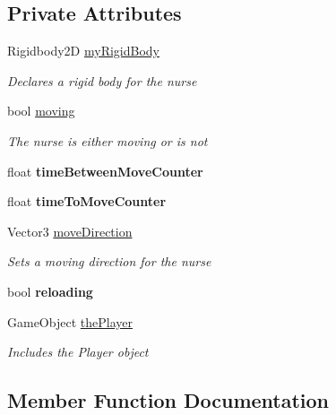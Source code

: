 \subsection*{Private Attributes}
\begin{DoxyCompactItemize}
\item 
Rigidbody2D \mbox{\hyperlink{class_nurse_controller_aa101cdff336129084914ac7b99c48dde}{my\+Rigid\+Body}}
\begin{DoxyCompactList}\small\item\em Declares a rigid body for the nurse \end{DoxyCompactList}\item 
bool \mbox{\hyperlink{class_nurse_controller_a51594c8ff5d4c71eeec6aef9fff4819c}{moving}}
\begin{DoxyCompactList}\small\item\em The nurse is either moving or is not \end{DoxyCompactList}\item 
\mbox{\label{class_nurse_controller_a9bfdcd467ebbc3af37fe73001a4849c9}} 
float {\bfseries time\+Between\+Move\+Counter}
\item 
\mbox{\label{class_nurse_controller_a2c76f2ef1ad2679c9696608306ad533f}} 
float {\bfseries time\+To\+Move\+Counter}
\item 
Vector3 \mbox{\hyperlink{class_nurse_controller_af1bbb9415d5e5fc25461cff6f72722f3}{move\+Direction}}
\begin{DoxyCompactList}\small\item\em Sets a moving direction for the nurse \end{DoxyCompactList}\item 
\mbox{\label{class_nurse_controller_a7542b5de536e73a0aee7cb8a499ea055}} 
bool {\bfseries reloading}
\item 
Game\+Object \mbox{\hyperlink{class_nurse_controller_a7977ec16f13d4a3b5b898ee479140a58}{the\+Player}}
\begin{DoxyCompactList}\small\item\em Includes the Player object \end{DoxyCompactList}\end{DoxyCompactItemize}


\subsection{Member Function Documentation}
\mbox{\label{class_nurse_controller_a80a67354fb792c665c686f8b3ef4ba8d}} 
